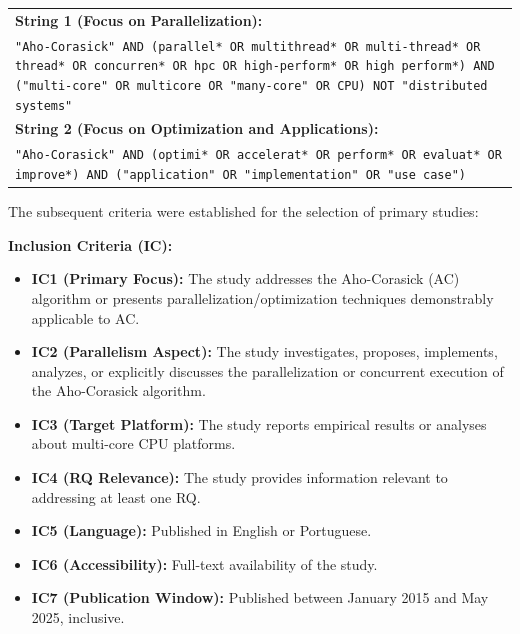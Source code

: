 \begin{tabular}{@{} p{\linewidth-2em} @{}}

    \textbf{String 1 (Focus on Parallelization):} \\
    \texttt{"Aho-Corasick" AND (parallel* OR multithread* OR multi-thread* OR thread* OR concurren* OR hpc OR high-perform* OR high perform*) AND ("multi-core" OR multicore OR "many-core" OR CPU) NOT "distributed systems"} \\

    \textbf{String 2 (Focus on Optimization and Applications):} \\
    \texttt{"Aho-Corasick" AND (optimi* OR accelerat* OR perform* OR evaluat* OR improve*) AND ("application" OR "implementation" OR "use case")} \\

\end{tabular}


The subsequent criteria were established for the selection of primary studies:

\textbf{Inclusion Criteria (IC):}
\begin{itemize}
    \item \textbf{IC1 (Primary Focus):} The study addresses the Aho-Corasick (AC) algorithm or presents parallelization/optimization techniques demonstrably applicable to AC.
    \item \textbf{IC2 (Parallelism Aspect):} The study investigates, proposes, implements, analyzes, or explicitly discusses the parallelization or concurrent execution of the Aho-Corasick algorithm.
    \item \textbf{IC3 (Target Platform):} The study reports empirical results or analyses about multi-core CPU platforms.
    \item \textbf{IC4 (RQ Relevance):} The study provides information relevant to addressing at least one RQ.
    \item \textbf{IC5 (Language):} Published in English or Portuguese.
    \item \textbf{IC6 (Accessibility):} Full-text availability of the study.
    \item \textbf{IC7 (Publication Window):} Published between January 2015 and May 2025, inclusive.
\end{itemize}


